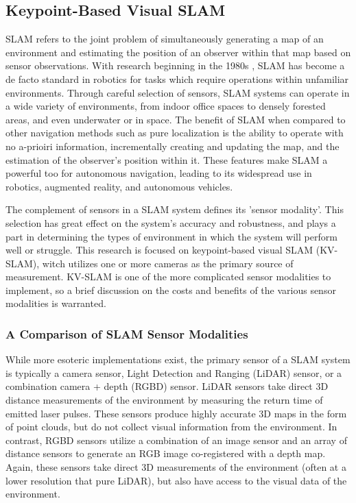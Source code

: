 \subsection{Keypoint-Based Visual SLAM}

SLAM refers to the joint problem of simultaneously generating a map of an environment and estimating the position of an observer within that map based on sensor observations. With research beginning in the 1980s \cite{smithEstimatingUncertainSpatial1988}, SLAM has become a de facto standard in robotics for tasks which require operations within unfamiliar environments. Through careful selection of sensors, SLAM systems can operate in a wide variety of environments, from indoor office spaces to densely forested areas, and even underwater or in space. The benefit of SLAM when compared to other navigation methods such as pure localization is the ability to operate with no a-prioiri information, incrementally creating and updating the map, and the estimation of the observer's position within it. These features make SLAM a powerful too for autonomous navigation, leading to its widespread use in robotics, augmented reality, and autonomous vehicles.



The complement of sensors in a SLAM system defines its 'sensor modality'. This selection has great effect on the system's accuracy and robustness, and plays a part in determining the types of environment in which the system will perform well or struggle. This research is focused on keypoint-based visual SLAM (KV-SLAM), witch utilizes one or more cameras as the primary source of measurement. KV-SLAM is one of the more complicated sensor modalities to implement, so a brief discussion on the costs and benefits of the various sensor modalities is warranted.

\subsubsection{A Comparison of SLAM Sensor Modalities}

While more esoteric implementations exist, the primary sensor of a SLAM system is typically a camera sensor, Light Detection and Ranging (LiDAR) sensor, or a combination camera + depth (RGBD) sensor. LiDAR sensors take direct 3D distance measurements of the environment by measuring the return time of emitted laser pulses. These sensors produce highly accurate 3D maps in the form of point clouds, but do not collect visual information from the environment. In contrast, RGBD sensors utilize a combination of an image sensor and an array of distance sensors to generate an RGB image co-registered with a depth map. Again, these sensors take direct 3D measurements of the environment (often at a lower resolution that pure LiDAR), but also have access to the visual data of the environment.

